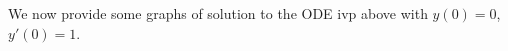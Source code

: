 \documentclass[12pt,reqno]{amsart}
\numberwithin{equation}{section}  %
\begin{document}
%
We now provide some graphs of solution to the ODE ivp above with $y(0) = 0$,
$y'(0) =1$. 

\begin{figure}[!ht]
  \begin{center}
\subfloat{\texttt{[image: c3b1]}} 
\subfloat{\texttt{[image: c3b3]}}
\\
\vspace{-40mm}
\subfloat{\texttt{[image: c7b3]}}
\subfloat{\texttt{[image: c13b3]}}
\end{center}
\end{figure}
\end{document}
